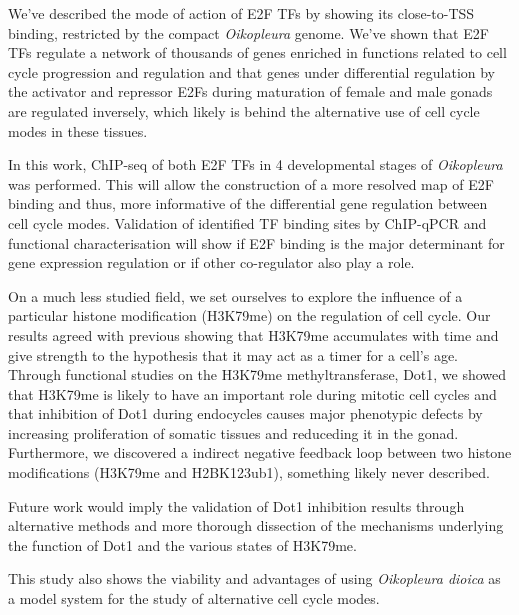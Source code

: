 \documentclass[11pt,twoside,a4paper]{report}
\begin{document}
We've described the mode of action of E2F TFs by showing its close-to-TSS binding, restricted by the compact \textit{Oikopleura} genome. We've shown that E2F TFs regulate a network of thousands of genes enriched in functions related to cell cycle progression and regulation and that genes under differential regulation by the activator and repressor E2Fs during maturation of female and male gonads are regulated inversely, which likely is behind the alternative use of cell cycle modes in these tissues.

In this work, ChIP-seq of both E2F TFs in 4 developmental stages of \textit{Oikopleura} was performed. This will allow the construction of a more resolved map of E2F binding and thus, more informative of the differential gene regulation between cell cycle modes. Validation of identified TF binding sites by ChIP-qPCR and functional characterisation will show if E2F binding is the major determinant for gene expression regulation or if other co-regulator also play a role.

On a much less studied field, we set ourselves to explore the influence of a particular histone modification (H3K79me) on the regulation of cell cycle. Our results agreed with previous showing that H3K79me accumulates with time and give strength to the hypothesis that it may act as a timer for a cell's age. Through functional studies on the H3K79me methyltransferase, Dot1, we showed that H3K79me is likely to have an important role during mitotic cell cycles and that inhibition of Dot1 during endocycles causes major phenotypic defects by increasing proliferation of somatic tissues and reduceding it in the gonad. Furthermore, we discovered a indirect negative feedback loop between two histone modifications (H3K79me and H2BK123ub1), something likely never described.

Future work would imply the validation of Dot1 inhibition results through alternative methods and more thorough dissection of the mechanisms underlying the function of Dot1 and the various states of H3K79me.

This study also shows the viability and advantages of using \textit{Oikopleura dioica} as a model system for the study of alternative cell cycle modes.


\cleardoublepage
%
%


\end{document}
